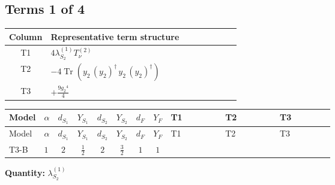 \documentclass[8pt]{article}
\begin{document}
\begin{landscape}
\subsection*{Terms 1 of 4}
\begin{center}
\begin{tabular}{@{}c >{\raggedright\arraybackslash}p{0.82\linewidth}@{}}
\toprule
Column & Representative term structure \\
\midrule
T1 & \(\displaystyle 4 {\lambda_{S_2}^{(1)}} T_{\nu}^{(2)}\) \\
\midrule
T2 & \(\displaystyle -4 \operatorname{Tr}\!\left({y_2}\,\left({y_2}\right)^{\dagger}\,{y_2}\,\left({y_2}\right)^{\dagger}\right)\) \\
\midrule
T3 & \(\displaystyle +\frac{9 {g_2}^4}{4}\) \\
\midrule
\bottomrule
\end{tabular}
\end{center}
\smallskip
\tiny
\begin{longtable}{@{}llcccccc >{\raggedright\arraybackslash}p{0.21\linewidth} >{\raggedright\arraybackslash}p{0.21\linewidth} >{\raggedright\arraybackslash}p{0.21\linewidth}@{}}
\toprule
Model & $\alpha$ & $d_{S_1}$ & $Y_{S_1}$ & $d_{S_2}$ & $Y_{S_2}$ & $d_F$ & $Y_F$ & T1 & T2 & T3 \\
\midrule
\endfirsthead
\toprule
Model & $\alpha$ & $d_{S_1}$ & $Y_{S_1}$ & $d_{S_2}$ & $Y_{S_2}$ & $d_F$ & $Y_F$ & T1 & T2 & T3 \\
\midrule
\endhead
T3-B & $1$ & $2$ & $\frac{1}{2}$ & $2$ & $\frac{3}{2}$ & $1$ & $1$ & \scriptsize\adjustbox{max width=\linewidth}{$\begin{gathered} 4 {\lambda_{S_2}^{(1)}} T_{\nu}^{(2)}\end{gathered}$} & \scriptsize\adjustbox{max width=\linewidth}{$\begin{gathered} -4 \operatorname{Tr}\!\left({y_2}\,\left({y_2}\right)^{\dagger}\,{y_2}\,\left({y_2}\right)^{\dagger}\right)\end{gathered}$} & \scriptsize\adjustbox{max width=\linewidth}{$\begin{gathered} +\frac{9 {g_2}^4}{4}\end{gathered}$} \\
\midrule
\bottomrule
\end{longtable}
\clearpage
\noindent\textbf{Quantity: }$\lambda_{S_2}^{(1)}$\par\smallskip

\end{landscape}
\end{document}
